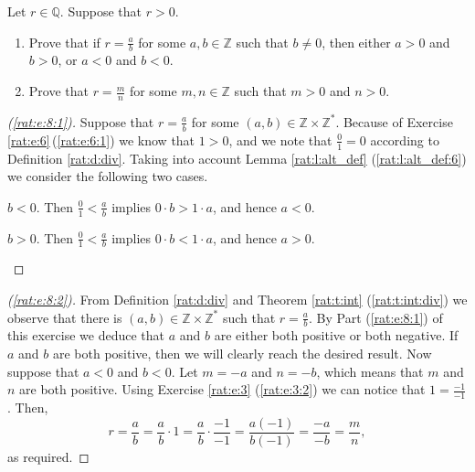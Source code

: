 \Newpage
\begin{exercise} %
	\label{rat:e:8}
	Let $r \in \mathbb{Q}$. Suppose that $r > 0$.
	\begin{enumerate}
		\item Prove that if $r = \frac{a}{b}$ for some $a, b \in \mathbb{Z}$ such that $b \neq 0$, then either $a > 0$ and $b > 0$, or $a < 0$ and $b < 0$. \label{rat:e:8:1}
		\item Prove that $r = \frac{m}{n}$ for some $m, n \in \mathbb{Z}$ such that $m > 0$ and $n > 0$. \label{rat:e:8:2}
	\end{enumerate}
\end{exercise}

\begin{proof}[(\ref{rat:e:8:1})]
	Suppose that $r = \frac{a}{b}$ for some $(a, b) \in \mathbb{Z} \times \mathbb{Z}^{*}$. Because of Exercise\,\ref{rat:e:6}\,(\ref{rat:e:6:1}) we know that $1 > 0$, and we note that $\frac{0}{1} = 0$ according to Definition \ref{rat:d:div}. Taking into account Lemma \ref{rat:l:alt_def} (\ref{rat:l:alt_def:6}) we consider the following two cases.
	\begin{bycases}
		\item $b < 0$. Then $\frac{0}{1} < \frac{a}{b}$ implies $0 \cdot b > 1 \cdot a$, and hence $a < 0$.
		\item $b > 0$. Then $\frac{0}{1} < \frac{a}{b}$ implies $0 \cdot b < 1 \cdot a$, and hence $a > 0$.
	\end{bycases}
\end{proof}

\begin{proof}[(\ref{rat:e:8:2})]
	From Definition \ref{rat:d:div} and Theorem \ref{rat:t:int} (\ref{rat:t:int:div}) we observe that there is ${(a, b) \in \mathbb{Z} \times \mathbb{Z}^{*}}$ such that $r = \frac{a}{b}$. By Part (\ref{rat:e:8:1}) of this exercise we deduce that $a$ and $b$ are either both positive or both negative. If $a$ and $b$ are both positive, then we will clearly reach the desired result. Now suppose that $a < 0$ and $b < 0$. Let $m = -a$ and $n = -b$, which means that $m$ and $n$ are both positive. Using Exercise \ref{rat:e:3} (\ref{rat:e:3:2}) we can notice that $1 = \frac{-1}{-1}$. Then,
	$$
		r = \frac{a}{b} = \frac{a}{b} \cdot 1 = \frac{a}{b} \cdot \frac{-1}{-1} = \frac{a(-1)}{b(-1)} = \frac{-a}{-b} = \frac{m}{n},
	$$
	as required.
\end{proof}


